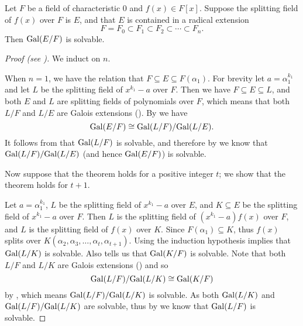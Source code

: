 \begin{theorem}[Galois]\label{thrm-solvable-by-radicals-implies-solvable-group}
    Let $F$ be a field of characteristic 0 and $f(x) \in F[x]$. Suppose the splitting field of $f(x)$ over $F$ is $E$, and that $E$ is contained in a radical extension
    \[
        F = F_0 \subset F_1 \subset F_2 \subset \cdots \subset F_n.
    \]
    Then $\mathrm{Gal}(E/F)$ is solvable.
\end{theorem}
\begin{proof}[Proof (see {\cite[Theorem 32.5]{gallian_2016}})]
    We induct on $n$.

    When $n = 1$, we have the relation that $F \subseteq E \subseteq F(\alpha_1)$. For brevity let $a = \alpha_1^{k_1}$ and let $L$ be the splitting field of $x^{k_1} - a$ over $F$. Then we have $F \subseteq E \subseteq L$, and both $E$ and $L$ are splitting fields of polynomials over $F$, which means that both $L/F$ and $L/E$ are Galois extensions (). By  we have
    \[
        \mathrm{Gal}(E/F) \cong \mathrm{Gal}(L/F)/\mathrm{Gal}(L/E).
    \]
    It follows from  that $\mathrm{Gal}(L/F)$ is solvable, and therefore by  we know that $\mathrm{Gal}(L/F)/\mathrm{Gal}(L/E)$ (and hence $\mathrm{Gal}(E/F)$) is solvable.

    Now suppose that the theorem holds for a positive integer $t$; we show that the theorem holds for $t + 1$.

    Let $a = \alpha_1^{k_1}$, $L$ be the splitting field of $x^{k_1} - a$ over $E$, and $K \subseteq E$ be the splitting field of $x^{k_1} - a$ over $F$. Then $L$ is the splitting field of $(x^{k_1}-a)f(x)$ over $F$, and $L$ is the splitting field of $f(x)$ over $K$. Since $F(\alpha_1) \subseteq K$, thus $f(x)$ splits over $K(\alpha_2, \alpha_3, \dots, \alpha_t, \alpha_{t+1})$. Using the induction hypothesis implies that $\mathrm{Gal}(L/K)$ is solvable. Also  tells us that $\mathrm{Gal}(K/F)$ is solvable. Note that both $L/F$ and $L/K$ are Galois extensions () and so
    \[
        \mathrm{Gal}(L/F)/\mathrm{Gal}(L/K) \cong \mathrm{Gal}(K/F)
    \]
    by , which means $\mathrm{Gal}(L/F)/\mathrm{Gal}(L/K)$ is solvable. As both $\mathrm{Gal}(L/K)$ and $\mathrm{Gal}(L/F)/\mathrm{Gal}(L/K)$ are solvable, thus by  we know that $\mathrm{Gal}(L/F)$ is solvable.
    

\end{proof}
